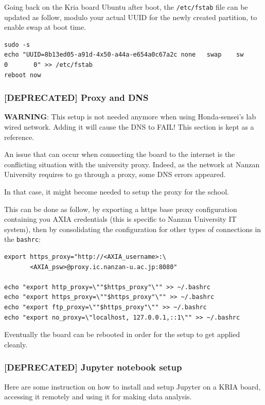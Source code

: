 \documentclass[10pt]{article}
\begin{document}
Going back on the Kria board Ubuntu after boot, the \texttt{/etc/fstab} file can be
updated as follow, modulo your actual UUID for the newly created partition, to
enable swap at boot time.
\begin{verbatim}
sudo -s
echo "UUID=8b13ed05-a91d-4x50-a44a-e654a0c67a2c none   swap    sw      0       0" >> /etc/fstab
reboot now
\end{verbatim}

\subsubsection{[DEPRECATED] Proxy and DNS}
\label{sec:org7c1f46d}
\begin{tcolorbox}[colback=orange!5!white,colframe=orange!75!black]
\textbf{WARNING}: This setup is not needed anymore when using Honda-sensei's lab
wired network.
Adding it will cause the DNS to FAIL!
This section is kept as a reference.
\end{tcolorbox}
An issue that can occur when connecting the board to the internet is the
conflicting situation with the university proxy.
Indeed, as the network at Nanzan University requires to go through a proxy,
some DNS errors appeared.

In that case, it might become needed to setup the proxy for the school.

This can be done as follow, by exporting a https base proxy configuration
containing you AXIA credentials (this is specific to Nanzan University IT system),
then by consolidating the configuration for other types of connections in the \texttt{bashrc}:

\begin{verbatim}
export https_proxy="http://<AXIA_username>:\
       <AXIA_psw>@proxy.ic.nanzan-u.ac.jp:8080"

echo "export http_proxy=\""$https_proxy"\"" >> ~/.bashrc
echo "export https_proxy=\""$https_proxy"\"" >> ~/.bashrc
echo "export ftp_proxy=\""$https_proxy"\"" >> ~/.bashrc
echo "export no_proxy=\"localhost, 127.0.0.1,::1\"" >> ~/.bashrc
\end{verbatim}

Eventually the board can be rebooted in order for the setup to get applied cleanly.

\subsubsection{[DEPRECATED] Jupyter notebook setup}
\label{sec:orga6948f8}
Here are some instruction on how to install and setup Jupyter on a KRIA board,
accessing it remotely and using it for making data analysis.
\end{document}
